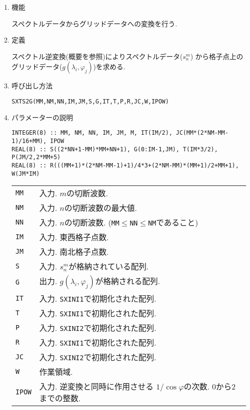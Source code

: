 \documentclass[a4j]{jsarticle}
\begin{document}
\begin{enumerate}

\item 機能 

スペクトルデータからグリッドデータへの変換を行う.

\item 定義

スペクトル逆変換(概要を参照)によりスペクトルデータ($s^m_n$)
から格子点上のグリッドデータ($g(\lambda_i,\varphi_j)$)を求める.

\item 呼び出し方法 

\texttt{SXTS2G(MM,NM,NN,IM,JM,S,G,IT,T,P,R,JC,W,IPOW)}
  
\item パラメーターの説明

\begin{verbatim}        
INTEGER(8) :: MM, NM, NN, IM, JM, M, IT(IM/2), JC(MM*(2*NM-MM-1)/16+MM), IPOW
REAL(8) :: S((2*NN+1-MM)*MM+NN+1), G(0:IM-1,JM), T(IM*3/2), P(JM/2,2*MM+5)
REAL(8) :: R(((MM+1)*(2*NM-MM-1)+1)/4*3+(2*NM-MM)*(MM+1)/2+MM+1), W(JM*IM)
\end{verbatim}      

\begin{tabular}{ll}
\texttt{MM} & 入力. $m$の切断波数.\\
\texttt{NM} & 入力. $n$の切断波数の最大値.\\
\texttt{NN} & 入力. $n$の切断波数.
(\texttt{MM}$\le$\texttt{NN}$\le$\texttt{NM}であること)\\
\texttt{IM} & 入力. 東西格子点数.\\
\texttt{JM} & 入力. 南北格子点数.\\
\texttt{S} & 入力. $s^m_n$が格納されている配列.\\
\texttt{G} & 出力. $g(\lambda_i,\varphi_j)$が格納される配列.\\
\texttt{IT} & 入力. \texttt{SXINI1}で初期化された配列.\\
\texttt{T} & 入力. \texttt{SXINI1}で初期化された配列.\\
\texttt{P}  & 入力. \texttt{SXINI2}で初期化された配列.\\
\texttt{R}  & 入力. \texttt{SXINI1}で初期化された配列.\\
\texttt{JC}  & 入力. \texttt{SXINI2}で初期化された配列.\\
\texttt{W} & 作業領域.\\
\texttt{IPOW} & 入力. 逆変換と同時に作用させる
                      $1/\cos\varphi$の次数. 0から2までの整数.
\end{tabular}


\end{enumerate}
\end{document}
